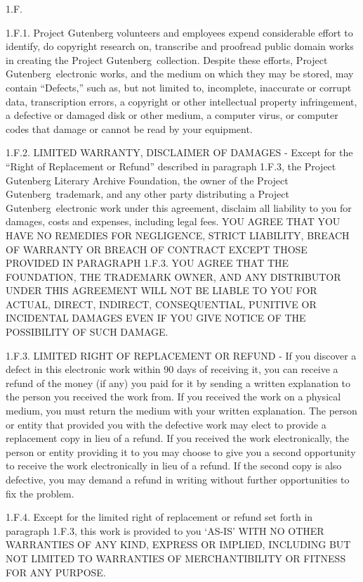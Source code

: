 1.F.

1.F.1.  Project Gutenberg volunteers and employees expend considerable
effort to identify, do copyright research on, transcribe and proofread
public domain works in creating the Project
Gutenberg\texttrademark\ collection.  Despite these
efforts, Project Gutenberg\texttrademark\ electronic
works, and the medium on which they may be stored, may contain
``Defects,'' such as, but not limited to, incomplete, inaccurate or
corrupt data, transcription errors, a copyright or other intellectual
property infringement, a defective or damaged disk or other medium, a
computer virus, or computer codes that damage or cannot be read by
your equipment.

1.F.2.  LIMITED WARRANTY, DISCLAIMER OF DAMAGES - Except for the
``Right of Replacement or Refund'' described in paragraph 1.F.3, the
Project Gutenberg Literary Archive Foundation, the owner of the
Project Gutenberg\texttrademark\ trademark, and any
other party distributing a Project
Gutenberg\texttrademark\ electronic work under this
agreement, disclaim all liability to you for damages, costs and
expenses, including legal fees.  YOU AGREE THAT YOU HAVE NO REMEDIES
FOR NEGLIGENCE, STRICT LIABILITY, BREACH OF WARRANTY OR BREACH OF
CONTRACT EXCEPT THOSE PROVIDED IN PARAGRAPH 1.F.3.  YOU AGREE THAT THE
FOUNDATION, THE TRADEMARK OWNER, AND ANY DISTRIBUTOR UNDER THIS
AGREEMENT WILL NOT BE LIABLE TO YOU FOR ACTUAL, DIRECT, INDIRECT,
CONSEQUENTIAL, PUNITIVE OR INCIDENTAL DAMAGES EVEN IF YOU GIVE NOTICE
OF THE POSSIBILITY OF SUCH DAMAGE.

1.F.3.  LIMITED RIGHT OF REPLACEMENT OR REFUND - If you discover a
defect in this electronic work within 90 days of receiving it, you can
receive a refund of the money (if any) you paid for it by sending a
written explanation to the person you received the work from.  If you
received the work on a physical medium, you must return the medium with
your written explanation.  The person or entity that provided you with
the defective work may elect to provide a replacement copy in lieu of a
refund.  If you received the work electronically, the person or entity
providing it to you may choose to give you a second opportunity to
receive the work electronically in lieu of a refund.  If the second copy
is also defective, you may demand a refund in writing without further
opportunities to fix the problem.

1.F.4.  Except for the limited right of replacement or refund set forth
in paragraph 1.F.3, this work is provided to you `AS-IS' WITH NO OTHER
WARRANTIES OF ANY KIND, EXPRESS OR IMPLIED, INCLUDING BUT NOT LIMITED TO
WARRANTIES OF MERCHANTIBILITY OR FITNESS FOR ANY PURPOSE.

